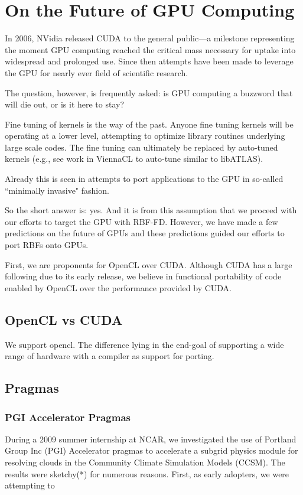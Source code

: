 \documentclass{report}
\begin{document}
\fi


\chapter{On the Future of GPU Computing}

In 2006, NVidia released CUDA to the general public---a milestone representing the moment GPU computing reached the critical mass necessary for uptake into widespread and prolonged use. Since then attempts have been made to leverage the GPU for nearly ever field of scientific research. 

The question, however, is frequently asked: is GPU computing a buzzword that will die out, or is it here to stay? 

Fine tuning of kernels is the way of the past. Anyone fine tuning kernels will be operating at a lower level, attempting to optimize library routines underlying large scale codes. The fine tuning can ultimately be replaced by auto-tuned kernels (e.g., see work in ViennaCL to auto-tune similar to libATLAS). 

Already this is seen in attempts to port applications to the GPU in so-called ``minimally invasive" fashion. 

So the short answer is: yes. And it is from this assumption that we proceed with our efforts to target the GPU with RBF-FD. However, we have made a few predictions on the future of GPUs and these predictions guided our efforts to port RBFs onto GPUs. 

First, we are proponents for OpenCL over CUDA. Although CUDA has a large following due to its early release, we believe in functional portability of code enabled by OpenCL over the performance provided by CUDA. 

\section{OpenCL vs CUDA}

We support opencl. The difference lying in the end-goal of supporting a wide range of hardware with a compiler as support for porting. 

\section{Pragmas}


\subsection{PGI Accelerator Pragmas}
During a 2009 summer internship at NCAR, we investigated the use of Portland Group Inc (PGI) Accelerator pragmas to accelerate a subgrid physics module for resolving clouds in the Community Climate Simulation Models (CCSM). The results were sketchy(*) for numerous reasons. First, as early adopters, we were attempting to  
\end{document}
